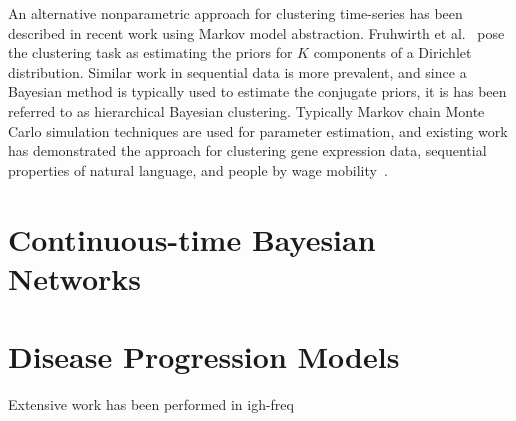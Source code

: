 An alternative nonparametric approach for clustering time-series has been described in recent work using Markov model abstraction.  Fruhwirth et al.~\cite{Pamminger_Fr_2010} pose the clustering task as estimating the priors for $K$ components of a Dirichlet distribution.  Similar work in sequential data is more prevalent, and since a Bayesian method is typically used to estimate the conjugate priors, it is has been referred to as hierarchical Bayesian clustering.  Typically Markov chain Monte Carlo simulation techniques are used for parameter estimation, and existing work has demonstrated the approach for clustering gene expression data, sequential properties of natural language, and people by wage mobility~\cite{Pamminger_Fr_2010,TehJorBea2006,XinSohJor2006}.



\section{Continuous-time Bayesian Networks}
\section{Disease Progression Models}
Extensive work has been performed in igh-freq
